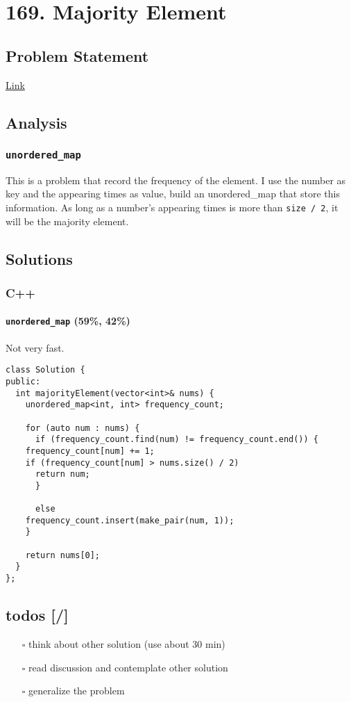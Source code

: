 \documentclass[12pt]{article}
\begin{document}
\section{169. Majority Element}
\label{sec:org0eceb09}
\subsection{Problem Statement}
\label{sec:org9523347}
\href{https://leetcode.com/problems/majority-element/}{Link}
\subsection{Analysis}
\label{sec:org9b934cc}
\subsubsection{\texttt{unordered\_map}}
\label{sec:org457329e}
This is a problem that record the frequency of the element. I use the number as key and the appearing times as value, build an unordered\_map that store this information. As long as a number's appearing times is more than \texttt{size / 2}, it will be the majority element.
\subsection{Solutions}
\label{sec:org2412427}
\subsubsection{C++}
\label{sec:org67e9035}
\paragraph{\texttt{unordered\_map} (59\%, 42\%)}
\label{sec:org781029b}
Not very fast.
\begin{verbatim}
class Solution {
public:
  int majorityElement(vector<int>& nums) {
    unordered_map<int, int> frequency_count;

    for (auto num : nums) {
      if (frequency_count.find(num) != frequency_count.end()) {
	frequency_count[num] += 1;
	if (frequency_count[num] > nums.size() / 2)
	  return num;
      }

      else
	frequency_count.insert(make_pair(num, 1));
    }

    return nums[0];
  }
};
\end{verbatim}
\subsection{todos [/]}
\label{sec:orgaa06c56}
\begin{itemize}
\item[{$\square$}] think about other solution (use about 30 min)
\item[{$\square$}] read discussion and contemplate other solution
\item[{$\square$}] generalize the problem
\end{itemize}
\end{document}
